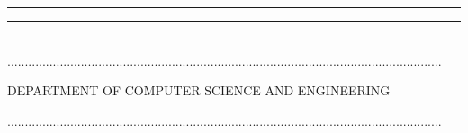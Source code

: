 \vspace{4\baselineskip}
\begin{minipage}[c]{0.45\textwidth}
\hrule 
\vspace{0.5\baselineskip}
\end{minipage}
\hspace{1.0\baselineskip}
\begin{minipage}[c]{0.45\textwidth}
\centering
\hrule 
\vspace{0.5\baselineskip}
\end{minipage}
\vspace{\baselineskip}
\\
............................................................................................................................
\begin{center}
          DEPARTMENT OF COMPUTER SCIENCE AND ENGINEERING 
\end{center}
............................................................................................................................ \newline
